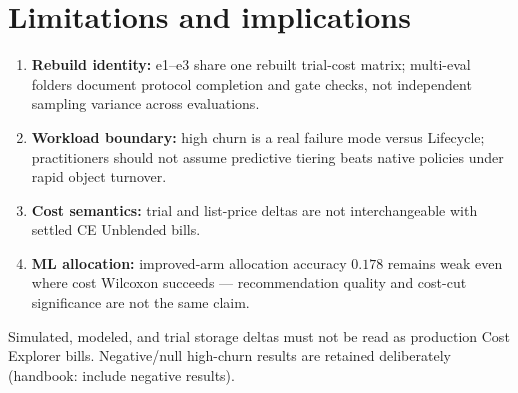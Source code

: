 \section{Limitations and implications}

\begin{enumerate}
    \item \textbf{Rebuild identity:} e1--e3 share one rebuilt trial-cost matrix; multi-eval
          folders document protocol completion and gate checks, not independent sampling
          variance across evaluations.
    \item \textbf{Workload boundary:} high churn is a real failure mode versus Lifecycle;
          practitioners should not assume predictive tiering beats native policies under
          rapid object turnover.
    \item \textbf{Cost semantics:} trial and list-price deltas are not interchangeable with
          settled CE Unblended bills.
    \item \textbf{ML allocation:} improved-arm allocation accuracy $0.178$ remains weak even
          where cost Wilcoxon succeeds --- recommendation quality and cost-cut significance
          are not the same claim.
\end{enumerate}

Simulated, modeled, and trial storage deltas must not be read as production Cost Explorer
bills. Negative/null high-churn results are retained deliberately (handbook: include
negative results).
